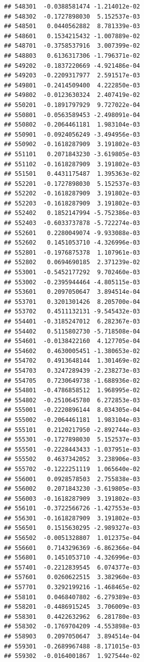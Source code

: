 \documentclass[ignorenonframetext,]{beamer}
\begin{document}
\begin{frame}[fragile]
\begin{verbatim}
## 548301  -0.0388581474 -1.214012e-02
## 548302  -0.1727898030  5.152537e-03
## 548501   0.0440562882  8.781339e-03
## 548601   0.1534215432 -1.007889e-02
## 548701  -0.3758537916  3.007399e-02
## 548803   0.6136317306 -1.796371e-02
## 549202  -0.1837220669 -4.921486e-04
## 549203  -0.2209317977  2.591517e-03
## 549801  -0.2414509400  4.222850e-03
## 549802  -0.0123630324  2.407419e-02
## 550201  -0.1891797929  9.727022e-04
## 550801  -0.0563589453 -2.498091e-04
## 550802  -0.2064461181  1.983104e-03
## 550901  -0.0924056249 -3.494956e-03
## 550902  -0.1618287909  3.191802e-03
## 551101   0.2071843230 -3.619805e-03
## 551102  -0.1618287909  3.191802e-03
## 551501   0.4431175487  1.395363e-02
## 552201  -0.1727898030  5.152537e-03
## 552202  -0.1618287909  3.191802e-03
## 552203  -0.1618287909  3.191802e-03
## 552402   0.1852147994 -5.752386e-03
## 552403  -0.6033737878 -5.722274e-03
## 552601   0.2280049074 -9.933088e-03
## 552602   0.1451053710 -4.326996e-03
## 552801  -0.1976875378  1.107961e-03
## 552802   0.0694690185  2.371239e-02
## 553001  -0.5452177292  9.702460e-03
## 553002  -0.2395944464 -4.805115e-03
## 553601   0.2097050647  3.894514e-04
## 553701   0.3201301426  8.205700e-04
## 553702   0.4511132131 -9.545432e-03
## 554401  -0.3185247012  6.282367e-03
## 554402   0.5115802730 -5.718508e-04
## 554601  -0.0138422160  4.127705e-04
## 554602   0.4630005451 -1.380653e-02
## 554702   0.4913648144  1.301469e-02
## 554703   0.3247289439 -2.238273e-03
## 554705   0.7230649738 -1.688936e-02
## 554801  -0.4786858512  1.968995e-02
## 554802  -0.2510645780  6.272853e-03
## 555001  -0.2220896144  8.034305e-04
## 555002  -0.2064461181  1.983104e-03
## 555101   0.2120217950 -2.892744e-03
## 555301  -0.1727898030  5.152537e-03
## 555501  -0.2228443433 -1.037951e-03
## 555502   0.4637342052  3.238906e-03
## 555702  -0.1222251119  1.065640e-02
## 556001   0.0928578503  2.755838e-03
## 556002   0.2071843230 -3.619805e-03
## 556003  -0.1618287909  3.191802e-03
## 556101  -0.3722566726 -1.427553e-03
## 556301  -0.1618287909  3.191802e-03
## 556501   0.1515630295 -2.989327e-03
## 556502  -0.0051328807  1.012375e-04
## 556601   0.7143296369 -6.862366e-04
## 556801   0.1451053710 -4.326996e-03
## 557401  -0.2212839545  6.074377e-03
## 557601   0.0260622515  3.382960e-03
## 557701   0.3292199216 -1.468465e-02
## 558101   0.0468407802 -6.279389e-03
## 558201  -0.4486915245  3.706009e-03
## 558301   0.4422632962  6.281780e-03
## 558302  -0.1769704209 -4.553898e-03
## 558903   0.2097050647  3.894514e-04
## 559301  -0.2689967488 -8.171015e-03
## 559302  -0.0164001867  1.927544e-02

\end{verbatim}
\end{frame}
\end{document}
